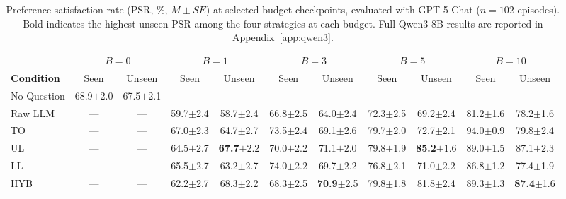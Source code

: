 \documentclass[manuscript,review,anonymous]{acmart}
\begin{document}
{\begin{table}[t]
\centering
\caption{Preference satisfaction rate (PSR, \%, $M \pm SE$) at selected budget checkpoints, evaluated with GPT-5-Chat ($n=102$ episodes). Bold indicates the highest unseen PSR among the four strategies at each budget. Full Qwen3-8B results are reported in Appendix~\ref{app:qwen3}.}
\label{tab:study1-results}
\begin{tabular}{l cc cc cc cc cc}
\toprule
 & \multicolumn{2}{c}{$B=0$} & \multicolumn{2}{c}{$B=1$} & \multicolumn{2}{c}{$B=3$} & \multicolumn{2}{c}{$B=5$} & \multicolumn{2}{c}{$B=10$} \\
\cmidrule(lr){2-3} \cmidrule(lr){4-5} \cmidrule(lr){6-7} \cmidrule(lr){8-9} \cmidrule(lr){10-11}
\textbf{Condition} & Seen & Unseen & Seen & Unseen & Seen & Unseen & Seen & Unseen & Seen & Unseen \\
\midrule
No Question & 68.9{\scriptsize$\pm$2.0} & 67.5{\scriptsize$\pm$2.1} & --- & --- & --- & --- & --- & --- & --- & --- \\
Raw LLM     & --- & --- & 59.7{\scriptsize$\pm$2.4} & 58.7{\scriptsize$\pm$2.4} & 66.8{\scriptsize$\pm$2.5} & 64.0{\scriptsize$\pm$2.4} & 72.3{\scriptsize$\pm$2.5} & 69.2{\scriptsize$\pm$2.4} & 81.2{\scriptsize$\pm$1.6} & 78.2{\scriptsize$\pm$1.6} \\
\midrule
TO          & --- & --- & 67.0{\scriptsize$\pm$2.3} & 64.7{\scriptsize$\pm$2.7} & 73.5{\scriptsize$\pm$2.4} & 69.1{\scriptsize$\pm$2.6} & 79.7{\scriptsize$\pm$2.0} & 72.7{\scriptsize$\pm$2.1} & 94.0{\scriptsize$\pm$0.9} & 79.8{\scriptsize$\pm$2.4} \\
UL         & --- & --- & 64.5{\scriptsize$\pm$2.7} & \textbf{67.7}{\scriptsize$\pm$2.2} & 70.0{\scriptsize$\pm$2.2} & 71.1{\scriptsize$\pm$2.0} & 79.8{\scriptsize$\pm$1.9} & \textbf{85.2}{\scriptsize$\pm$1.6} & 89.0{\scriptsize$\pm$1.5} & 87.1{\scriptsize$\pm$2.3} \\
LL         & --- & --- & 65.5{\scriptsize$\pm$2.7} & 63.2{\scriptsize$\pm$2.7} & 74.0{\scriptsize$\pm$2.2} & 69.7{\scriptsize$\pm$2.2} & 76.8{\scriptsize$\pm$2.1} & 71.0{\scriptsize$\pm$2.2} & 86.8{\scriptsize$\pm$1.2} & 77.4{\scriptsize$\pm$1.9} \\
HYB         & --- & --- & 62.2{\scriptsize$\pm$2.7} & 68.3{\scriptsize$\pm$2.2} & 68.3{\scriptsize$\pm$2.5} & \textbf{70.9}{\scriptsize$\pm$2.5} & 79.8{\scriptsize$\pm$1.8} & 81.8{\scriptsize$\pm$2.4} & 89.3{\scriptsize$\pm$1.3} & \textbf{87.4}{\scriptsize$\pm$1.6} \\
\bottomrule
\end{tabular}
\end{table}

}
\end{document}
